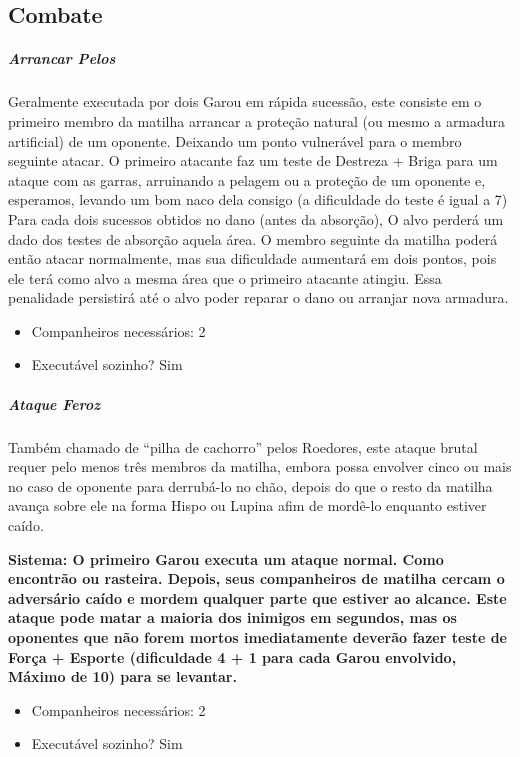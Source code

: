 
\begin{multicols}{2}
\subsection{\bf Combate}

\subparagraph{\bf Arrancar Pelos}
Geralmente executada por dois Garou em rápida sucessão, este consiste em o primeiro membro da matilha arrancar a proteção natural (ou mesmo a armadura artificial) de um oponente. Deixando um ponto vulnerável para o membro seguinte atacar. 
O primeiro atacante faz um teste de Destreza + Briga para um ataque com as garras, arruinando a pelagem ou a proteção de um oponente e, esperamos, levando um bom naco dela consigo (a dificuldade do teste é igual a 7) Para cada dois sucessos obtidos no dano (antes da absorção), O alvo perderá um dado dos testes de absorção aquela área. O membro seguinte da matilha poderá então atacar normalmente, mas sua dificuldade aumentará em dois pontos, pois ele terá como alvo a mesma área que o primeiro atacante atingiu. Essa penalidade persistirá até o alvo poder reparar o dano ou arranjar nova armadura.
\begin{itemize}[noitemsep]
\item Companheiros necessários: 2 
\item Executável sozinho? Sim
\end{itemize}

\subparagraph{\bf Ataque Feroz}
Também chamado de “pilha de cachorro” pelos Roedores, este ataque brutal requer pelo menos três membros da matilha, embora possa envolver cinco ou mais no caso de oponente para derrubá-lo no chão, depois do que o resto da matilha avança sobre ele na forma Hispo ou Lupina afim de mordê-lo enquanto estiver caído.

\bf{Sistema:} O primeiro Garou executa um ataque normal. Como encontrão ou rasteira. Depois, seus companheiros de matilha cercam o adversário caído e mordem qualquer parte que estiver ao alcance. Este ataque pode matar a maioria dos inimigos em segundos, mas os oponentes que não forem mortos imediatamente deverão fazer teste de Força + Esporte (dificuldade 4 + 1 para cada Garou envolvido, Máximo de 10) para se levantar. 
\begin{itemize}[noitemsep]
\item Companheiros necessários: 2 
\item Executável sozinho? Sim
\end{itemize}


\end{multicols}
